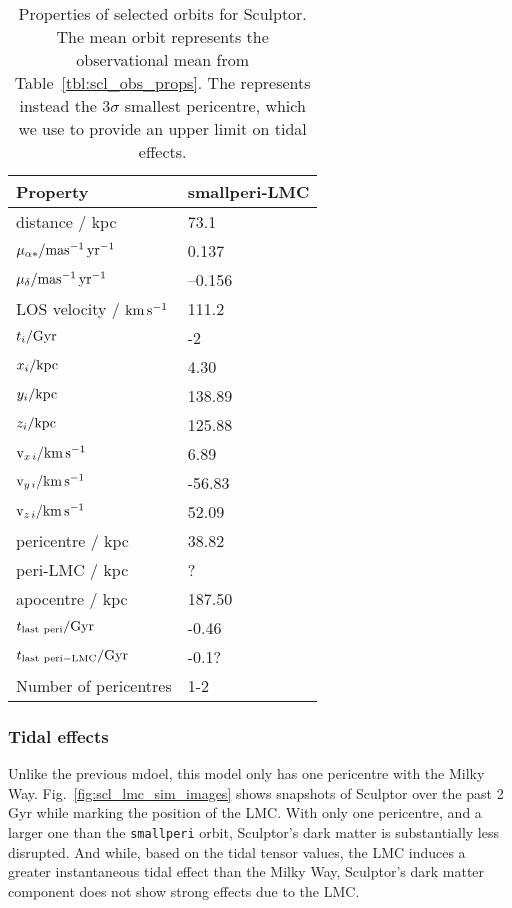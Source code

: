 \begin{table*}[t]
\centering
\caption[Sculptor Selected Orbits]{Properties of selected orbits for Sculptor. The mean orbit represents the observational mean from Table \ref{tbl:scl_obs_props}. The \smallperi{} represents instead the $3\sigma$ smallest pericentre, which we use to provide an upper limit on tidal effects. }
\label{tbl:scl_orbits}
\begin{tabular}{ll}
\toprule
Property & smallperi-LMC\\
\midrule
distance / kpc & 73.1\\
$\mu_{\alpha*} / {\rm mas^{-1}\,yr^{-1}}$ & 0.137\\
$\mu_{\delta} / {\rm mas^{-1}\,yr^{-1}}$ & –0.156\\
LOS velocity / ${\rm km\,s^{-1}}$ & 111.2\\
$t_i / {\rm Gyr}$ & -2\\
${x}_{i} / {\rm kpc}$ & 4.30\\
${y}_{i} / {\rm kpc}$ & 138.89\\
${z}_{i} / {\rm kpc}$ & 125.88\\
${\rm v}_{x\,i} / {\rm km\,s^{-1}}$ & 6.89\\
${\rm v}_{y\,i} / {\rm km\,s^{-1}}$ & -56.83\\
${\rm v}_{z\,i} / {\rm km\,s^{-1}}$ & 52.09\\
pericentre / kpc & 38.82\\
peri-LMC / kpc & ?\\
apocentre / kpc & 187.50\\
$t_{\rm last\ peri} / {\rm Gyr}$ & -0.46\\
$t_{\rm last\ peri-LMC} / \Gyr$ & -0.1?\\
Number of pericentres & 1-2\\
\bottomrule
\end{tabular}
\end{table*}

\subsubsection{Tidal effects}\label{tidal-effects}

Unlike the previous mdoel, this model only has one pericentre with the
Milky Way. Fig.~\ref{fig:scl_lmc_sim_images} shows snapshots of Sculptor
over the past 2 Gyr while marking the position of the LMC. With only one
pericentre, and a larger one than the \texttt{smallperi} orbit,
Sculptor's dark matter is substantially less disrupted. And while, based
on the tidal tensor values, the LMC induces a greater instantaneous
tidal effect than the Milky Way, Sculptor's dark matter component does
not show strong effects due to the LMC.

